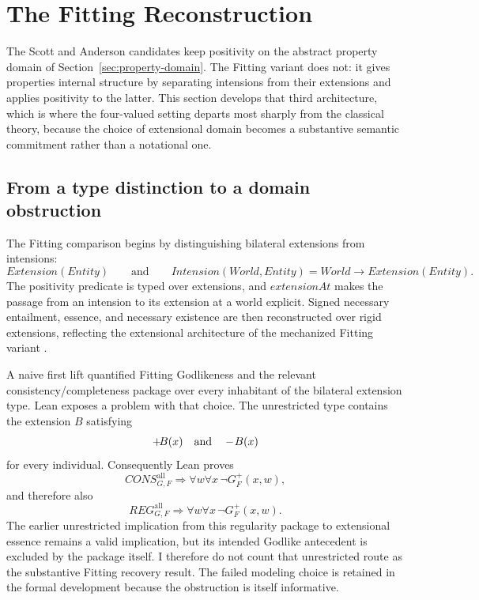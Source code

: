 \section{The Fitting Reconstruction}
\label{sec:fitting}

\statusestablished

The Scott and Anderson candidates keep positivity on the abstract property domain of Section~\ref{sec:property-domain}. The Fitting variant does not: it gives properties internal structure by separating intensions from their extensions and applies positivity to the latter. This section develops that third architecture, which is where the four-valued setting departs most sharply from the classical theory, because the choice of extensional domain becomes a substantive semantic commitment rather than a notational one.

\subsection{From a type distinction to a domain obstruction}
\label{sec:fitting-obstruction}

The Fitting comparison begins by distinguishing bilateral extensions from intensions:
\[
  Extension(Entity)
  \qquad\text{and}\qquad
  Intension(World,Entity)=World\to Extension(Entity).
\]
The positivity predicate is typed over extensions, and \(extensionAt\) makes the passage from an intension to its extension at a world explicit. Signed necessary entailment, essence, and necessary existence are then reconstructed over rigid extensions, reflecting the extensional architecture of the mechanized Fitting variant \cite{BenzmuellerFuenmayor2019}.

A naive first lift quantified Fitting Godlikeness and the relevant consistency/completeness package over every inhabitant of the bilateral extension type. Lean exposes a problem with that choice. The unrestricted type contains the extension \(B\) satisfying
\[
  +\!B(x)\quad\text{and}\quad-\!B(x)
\]
for every individual. Consequently Lean proves
\[
  CONS_{G,F}^{\mathrm{all}}
  \Longrightarrow
  \forall w\forall x\,\neg G_F^+(x,w),
\]
and therefore also
\[
  REG_{G,F}^{\mathrm{all}}
  \Longrightarrow
  \forall w\forall x\,\neg G_F^+(x,w).
\]
The earlier unrestricted implication from this regularity package to extensional essence remains a valid implication, but its intended Godlike antecedent is excluded by the package itself. I therefore do not count that unrestricted route as the substantive Fitting recovery result. The failed modeling choice is retained in the formal development because the obstruction is itself informative.

